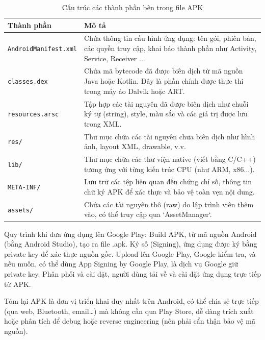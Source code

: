         \begin{table}[H]
            \centering
            \renewcommand{\arraystretch}{1.5}
            \begin{tabular}{|l|p{11cm}|}
                \hline
                \textbf{Thành phần} & \textbf{Mô tả} \\
                \hline
                \texttt{AndroidManifest.xml} & Chứa thông tin cấu hình ứng dụng: tên gói, phiên bản, các quyền truy cập, khai báo thành phần như Activity, Service, Receiver \cite{AndroidManifest.xml}... \\
                \hline
                \texttt{classes.dex} & Chứa mã bytecode đã được biên dịch từ mã nguồn Java hoặc Kotlin. Đây là phần chính được thực thi trong máy ảo Dalvik hoặc ART. \\
                \hline
                \texttt{resources.arsc} & Tập hợp các tài nguyên đã được biên dịch như chuỗi ký tự (string), style, màu sắc và các giá trị được lưu trong XML. \\
                \hline
                \texttt{res/} & Thư mục chứa các tài nguyên chưa biên dịch như hình ảnh, layout XML, drawable, v.v. \\
                \hline
                \texttt{lib/} & Thư mục chứa các thư viện native (viết bằng C/C++) tương ứng với từng kiến trúc CPU (như ARM, x86...). \\
                \hline
                \texttt{META-INF/} & Lưu trữ các tệp liên quan đến chứng chỉ số, thông tin chữ ký APK để xác thực và bảo vệ toàn vẹn nội dung. \\
                \hline
                \texttt{assets/} & Chứa các tài nguyên thô (raw) do lập trình viên thêm vào, có thể truy cập qua `AssetManager`. \\
                \hline
            \end{tabular}
            \caption{Cấu trúc các thành phần bên trong file APK}
            \label{table:apk-structure}
            \end{table}            
    
        Quy trình khi đưa ứng dụng lên Google Play: Build APK, từ mã nguồn Android (bằng Android Studio), tạo ra file .apk. Ký số (Signing), ứng dụng được ký bằng private key để xác thực nguồn gốc. Upload lên Google Play, Google kiểm tra, và nếu muốn, có thể dùng App Signing by Google Play, là dịch vụ Google giữ private key. Phân phối và cài đặt, người dùng tải về và cài đặt ứng dụng trực tiếp từ APK.
        
        \vspace{0.5em}

        Tóm lại APK là đơn vị triển khai duy nhất trên Android, có thể chia sẻ trực tiếp (qua web, Bluetooth, email…) mà không cần qua Play Store, dễ dàng trích xuất hoặc phân tích để debug hoặc reverse engineering (nên phải cẩn thận bảo vệ mã nguồn).
